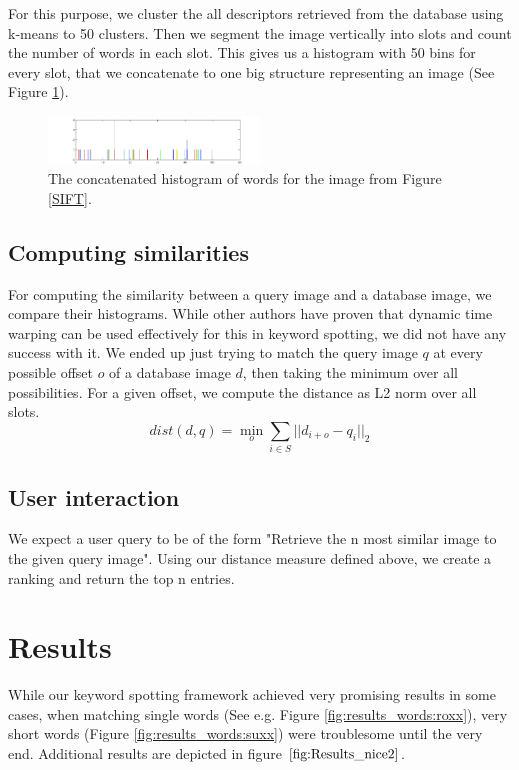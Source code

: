 \documentclass[conference]{IEEEtran}
\begin{document}
For this purpose, we cluster the all descriptors retrieved from the database using k-means to
50 clusters. Then we segment the image vertically into slots and count the number of words 
in each slot. This gives us a histogram with 50 bins for every slot, that we concatenate to one
big structure representing an image (See Figure \ref{fig:histogram}).
\begin{figure}[!t]
\centering
\includegraphics[width=0.5\textwidth]{kvniginne_histogram}
\caption{The concatenated histogram of words for the image from Figure \ref{SIFT}.}
\label{fig:histogram}
\end{figure}

\subsection{Computing similarities}
\label{sub:similarities}
For computing the similarity between a query image and a database image, 
we compare their histograms. While other authors have proven that dynamic time warping can be
used effectively for this in keyword spotting, we did not have any success with it. We ended
up just trying to match the query image $q$ 
at every possible offset $o$ of a database image $d$, then taking
the minimum over all possibilities.
 For a given offset, we compute the distance as L2 norm over all slots.
\begin{equation}
	dist(d, q) = \min_o \sum_{i \in S} || d_{i + o} - q_{i}  ||_2
\end{equation}


\subsection{User interaction}
\label{sub:user interaction}
We expect a user query to be of the form "Retrieve the n most similar image to the given query
image". Using our distance measure defined above, 
we create a ranking and return the top n entries.

\section{Results}
While our keyword spotting framework achieved very promising results in some cases, when matching single words (See e.g. Figure \ref{fig:results_words:roxx}), very short words (Figure \ref{fig:results_words:suxx}) were troublesome until the very end. Additional results are depicted in figure $\ref{fig:Results_nice2}$.
\end{document}
